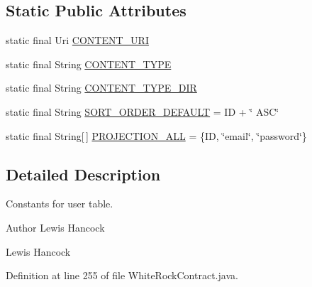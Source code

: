 \subsection*{Static Public Attributes}
\begin{DoxyCompactItemize}
\item 
static final Uri \hyperlink{classuk_1_1ac_1_1swan_1_1digitaltrails_1_1database_1_1_white_rock_contract_1_1_user_a66e36a1bfe98d6316b8f38f48deb21ae}{C\+O\+N\+T\+E\+N\+T\+\_\+\+U\+R\+I}
\item 
static final String \hyperlink{classuk_1_1ac_1_1swan_1_1digitaltrails_1_1database_1_1_white_rock_contract_1_1_user_a9baf3520bdfb3aac95416344854d722e}{C\+O\+N\+T\+E\+N\+T\+\_\+\+T\+Y\+P\+E}
\item 
static final String \hyperlink{classuk_1_1ac_1_1swan_1_1digitaltrails_1_1database_1_1_white_rock_contract_1_1_user_aaed02407aa17f480398793178acda360}{C\+O\+N\+T\+E\+N\+T\+\_\+\+T\+Y\+P\+E\+\_\+\+D\+I\+R}
\item 
static final String \hyperlink{classuk_1_1ac_1_1swan_1_1digitaltrails_1_1database_1_1_white_rock_contract_1_1_user_aa9e4aca61aaad6fde37d92e184d02d29}{S\+O\+R\+T\+\_\+\+O\+R\+D\+E\+R\+\_\+\+D\+E\+F\+A\+U\+L\+T} = I\+D + \char`\"{} A\+S\+C\char`\"{}
\item 
static final String\mbox{[}$\,$\mbox{]} \hyperlink{classuk_1_1ac_1_1swan_1_1digitaltrails_1_1database_1_1_white_rock_contract_1_1_user_a89911900fe3189ac200c32af768010b0}{P\+R\+O\+J\+E\+C\+T\+I\+O\+N\+\_\+\+A\+L\+L} = \{I\+D, \char`\"{}email\char`\"{}, \char`\"{}password\char`\"{}\}
\end{DoxyCompactItemize}


\subsection{Detailed Description}
Constants for user table. 

\begin{DoxyAuthor}{Author}
Lewis Hancock 

Lewis Hancock 
\end{DoxyAuthor}


Definition at line 255 of file White\+Rock\+Contract.\+java.




